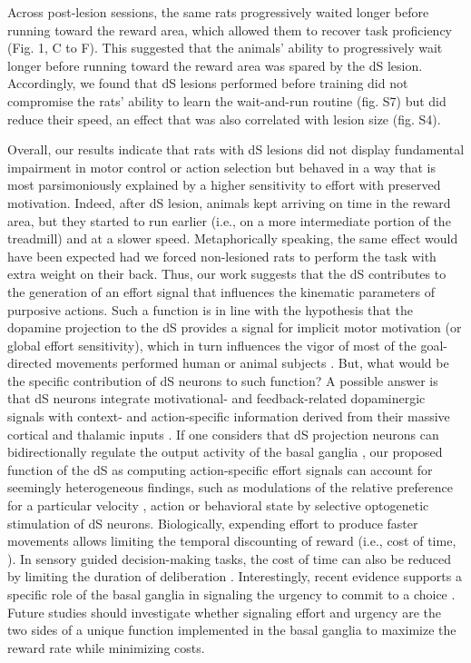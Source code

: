 Across post-lesion sessions, the same rats progressively waited longer before running toward the reward area, which allowed them to recover task proficiency (Fig. 1, C to F).
This suggested that the animals' ability to progressively wait longer before running toward the reward area was spared by the dS lesion.
Accordingly, we found that dS lesions performed before training did not compromise the rats' ability to learn the wait-and-run routine (fig. S7) but did reduce their speed, an effect that was also correlated with lesion size (fig. S4). 
\par
Overall, our results indicate that rats with dS lesions did not display fundamental impairment in motor control or action selection but behaved in a way that is most parsimoniously  explained by a higher sensitivity to effort with preserved motivation.
Indeed, after dS lesion, animals kept arriving on time in the reward area, but they started to run earlier (i.e., on a more intermediate portion of the treadmill) and at a slower speed.
Metaphorically speaking, the same effect would have been expected had we forced non-lesioned rats to perform the task with extra weight on their back. 
Thus, our work suggests that the dS contributes to the generation of an effort signal that influences the kinematic parameters of purposive actions.
Such a function is in line with the hypothesis that the dopamine projection to the dS provides a signal for implicit motor motivation (or global effort sensitivity), which in turn influences the vigor of most of the goal-directed movements performed human or animal subjects \cite{Mazzoni2007JN, Treadway2012JN, Reppert2018JNPhys}.
But, what would be the specific contribution of dS neurons to such function?
A possible answer is that dS neurons integrate motivational- and feedback-related dopaminergic signals with context- and action-specific information derived from their massive cortical and thalamic inputs  \cite{Hunnicutt2016Elife, Hooks2018NatCom}.
If one considers that dS projection neurons can bidirectionally regulate the output activity of the basal ganglia \cite{Kravitz2010}, our proposed function of the dS as computing action-specific effort signals can account for seemingly heterogeneous findings, such as modulations of the relative preference for a particular velocity \cite{ Yttri2016}, action \cite{Tai2012NN, Kravitz2012NN} or behavioral state \cite{Kravitz2010} by selective optogenetic stimulation of dS neurons.
Biologically, expending effort to produce faster movements allows limiting the temporal discounting of reward (i.e., cost of time, \cite{Shadmehr2019TINS}).
In sensory guided decision-making tasks, the cost of time can also be reduced by limiting the duration of deliberation \cite{Carland2019}. 
Interestingly, recent evidence supports a specific role of the basal ganglia in signaling the urgency to commit to a choice \cite{Thura2017Neuron,Carland2019}. 
Future studies should investigate whether signaling effort and urgency are the two sides of a unique function implemented in the basal ganglia to maximize the reward rate while minimizing costs.
